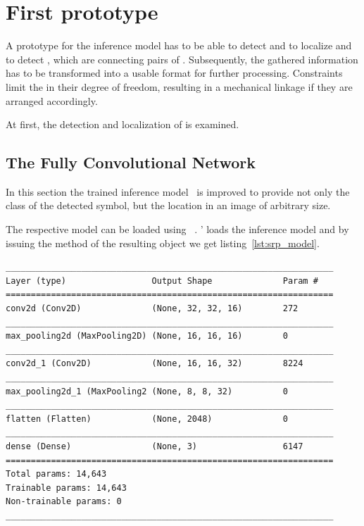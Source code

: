 \section{First prototype}\label{ch:first_prototype}

A prototype for the inference model has to be able to detect and to localize  and to detect , which are connecting pairs of .
Subsequently, the gathered information has to be transformed into a usable format for further processing.
Constraints limit the  in their degree of freedom, resulting in a mechanical linkage if they are arranged accordingly.

At first, the detection and localization of  is examined.

\subsection{The Fully Convolutional Network}\label{ch:fcn}

In this section the trained inference model~\cite{Lawrence2020} is improved to provide not only the class of the detected symbol, but the location in an image of arbitrary size.

The respective model can be loaded using ~\cite{Chollet2019}.
'  loads the inference model and by issuing the  method of the resulting object we get listing~\ref{lst:srp_model}.

\begin{lstlisting}[caption={Summary of Symbol Classifier.}, label={lst:srp_model}]
_________________________________________________________________
Layer (type)                 Output Shape              Param #
=================================================================
conv2d (Conv2D)              (None, 32, 32, 16)        272
_________________________________________________________________
max_pooling2d (MaxPooling2D) (None, 16, 16, 16)        0
_________________________________________________________________
conv2d_1 (Conv2D)            (None, 16, 16, 32)        8224
_________________________________________________________________
max_pooling2d_1 (MaxPooling2 (None, 8, 8, 32)          0
_________________________________________________________________
flatten (Flatten)            (None, 2048)              0
_________________________________________________________________
dense (Dense)                (None, 3)                 6147
=================================================================
Total params: 14,643
Trainable params: 14,643
Non-trainable params: 0
_________________________________________________________________
\end{lstlisting}

